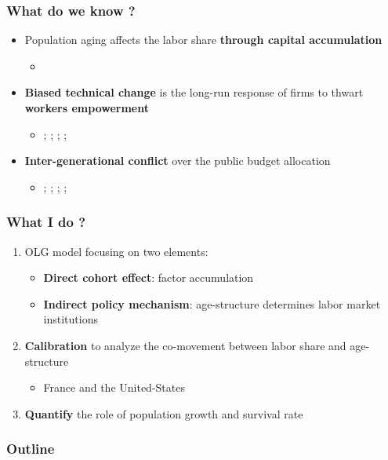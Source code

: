 \documentclass[usenames,dvipsnames]{beamer}
\begin{document}
	\begin{frame}\frametitle{What do we know ?}
		\begin{itemize}
			\item Population aging affects the labor share \textbf{through capital accumulation}
			\begin{itemize}
				\item {\scriptsize\color{CadetBlue}\textbf{\cite{Schmidt2013}}}
			\end{itemize}
			\vspace{2em}
			\item \textbf{Biased technical change} is the long-run response of firms to thwart \textbf{workers empowerment}
			\begin{itemize}
				\item {\scriptsize\color{CadetBlue}\textbf{\cite{Caballero1998}}; \cite{Blanchard1997}; \cite{Bentolila2003}; \cite{Acemoglu2002}; \cite{Karabarbounis2014}}
			\end{itemize}
			\vspace{2em}
			\item \textbf{Inter-generational conflict} over the public budget allocation
				\begin{itemize}
					\item {\scriptsize\color{CadetBlue}\textbf{\cite{Gonzalez-Eiras2012}}; \cite{Lancia2012}; \cite{Busemeyer2009}; \cite{Sorensen2013}; \cite{Jager2016}}
				\end{itemize}
		\end{itemize}
	\end{frame}
	\begin{frame}\frametitle{What I do ?}
		\begin{enumerate}[default]
			\item OLG model focusing on two elements:
			\begin{itemize}
				\item \textbf{Direct cohort effect}: factor accumulation
				\item \textbf{Indirect policy mechanism}: age-structure determines labor market institutions
			\end{itemize}
			\vspace{2em}
			\item \textbf{Calibration} to analyze the co-movement between labor share and age-structure
			\begin{itemize}
				\item France and the United-States
			\end{itemize}
			\vspace{2em}
			\item \textbf{Quantify} the role of population growth and survival rate
		\end{enumerate}
	\end{frame}
	\begin{frame} \frametitle{Outline}
		\tableofcontents[sectionstyle=show, hideallsubsections]
	\end{frame}
\end{document}
